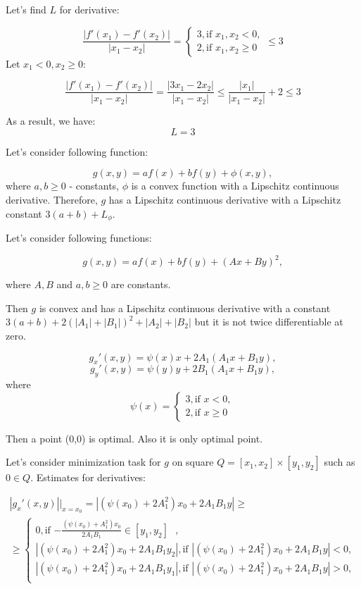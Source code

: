 \documentclass[12pt]{article}
\begin{document}
Let's find $L$ for derivative:

\begin{equation}
\frac{|f'(x_1) - f'(x_2)|}{|x_1-x_2|} = \begin{cases}
3, \text{if $x_1, x_2 < 0$},\\
2, \text{if $x_1, x_2 \geq 0$}
\end{cases}\leq 3
\end{equation}
Let $x_1<0, x_2\geq 0$: 

$$\frac{|f'(x_1) - f'(x_2)|}{|x_1-x_2|} = \frac{|3x_1 - 2x_2|}{|x_1-x_2|} \leq \frac{|x_1|}{|x_1-x_2|} + 2\leq 3$$

As a result, we have:
$$L = 3$$

Let's consider following function:

$$g(x,y) = af(x)+bf(y) + \phi(x,y),$$
where $a,b\geq 0$ - constants, $\phi$ is a convex function with a Lipschitz continuous derivative. Therefore, $g$ has a Lipschitz continuous derivative with a Lipschitz constant $3(a+b) + L_\phi$.

Let's consider following functions:

$$g(x,y) = af(x) + bf(y) + (Ax+By)^2,$$

where $A, B$ and $a, b\geq 0$ are constants.

Then $g$ is convex and has a Lipschitz continuous derivative with a constant $3(a+b) + 2(|A_1|+|B_1|)^2 + |A_2| + |B_2|$ but it is not twice differentiable at zero.

$$g_x'(x,y) = \psi(x) x + 2A_1(A_1x+B_1y),$$
$$g_y'(x,y) = \psi(y) y + 2B_1(A_1x+B_1y),$$
where 
\begin{equation}
\psi(x) = \begin{cases}
3, \text{if $x < 0$},\\
2, \text{if $x \geq 0$}
\end{cases}
\end{equation}

Then a point (0,0) is optimal. Also it is only optimal point. 

Let's consider minimization task for $g$ on square $Q = [x_1, x_2]\times [y_1, y_2]$ such as $0\in Q$. Estimates for derivatives:

\begin{eqnarray}
|g_x'(x,y)|\Big|_{x=x_0} = |(\psi(x_0) + 2A_1^2)x_0 + 2A_1B_1y| \geq \nonumber\\
\geq \begin{cases}
0, \text{if $-\frac{(\psi(x_0) + A_1^2)x_0}{2A_1B_1}\in [y_1, y_2]$ },\\
|(\psi(x_0) + 2A_1^2)x_0 + 2A_1B_1y_2|, \text{if $|(\psi(x_0) + 2A_1^2)x_0 + 2A_1B_1y|<0$},\\ 
|(\psi(x_0) + 2A_1^2)x_0 + 2A_1B_1y_1|, \text{if $|(\psi(x_0) + 2A_1^2)x_0 + 2A_1B_1y|>0$},\\
\end{cases}
\end{eqnarray}
\end{document}
